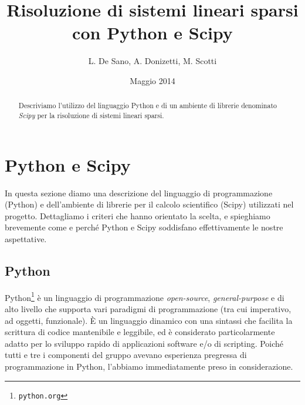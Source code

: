 \documentclass[11pt,a4paper]{scrartcl}
\author{L. De Sano, A. Donizetti, M. Scotti}
\title{Risoluzione di sistemi lineari sparsi \\con Python e Scipy}
\date{Maggio 2014}
\begin{document}
\maketitle
\begin{abstract}
Descriviamo l'utilizzo del linguaggio Python e di un ambiente di librerie denominato \emph{Scipy} per la risoluzione di sistemi lineari sparsi.
\end{abstract}

\section*{Python e Scipy}

In questa sezione diamo una descrizione del linguaggio di programmazione (Python) e dell'ambiente di librerie per il calcolo scientifico (Scipy) utilizzati nel progetto. Dettagliamo i criteri che hanno orientato la scelta, e spieghiamo brevemente come e perché Python e Scipy soddisfano effettivamente le nostre aspettative.

\subsection*{Python}

Python\footnote{\texttt{python.org}} è un linguaggio di programmazione \emph{open-source}, \emph{general-purpose} e di alto livello che supporta vari paradigmi di programmazione (tra cui imperativo, ad oggetti, funzionale). È un linguaggio dinamico con una sintassi che facilita la scrittura di codice mantenibile e leggibile, ed è considerato particolarmente adatto per lo sviluppo rapido di applicazioni software e/o di scripting. Poiché tutti e tre i componenti del gruppo avevano esperienza pregressa di programmazione in Python, l'abbiamo immediatamente preso in considerazione.
\end{document}
